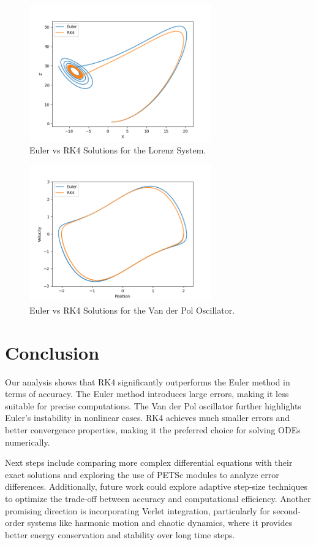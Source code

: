 \documentclass{article}
\begin{document}
\begin{center}
    \begin{figure}[htbp]
        \centering
        \includegraphics[width=0.7\textwidth]{results/figures/lorenz.png}
        \caption{Euler vs RK4 Solutions for the Lorenz System.}
        \label{fig:lorenz}
    \end{figure}
    
    \begin{figure}[htbp]
        \centering
        \includegraphics[width=0.7\textwidth]{results/figures/vdp.png}
        \caption{Euler vs RK4 Solutions for the Van der Pol Oscillator.}
        \label{fig:vanderpol}
    \end{figure}
    \end{center}
    
    \clearpage  %
    
\section{Conclusion}
Our analysis shows that RK4 significantly outperforms the Euler method in terms of accuracy. The Euler method introduces large errors, making it less suitable for precise computations. The Van der Pol oscillator further highlights Euler’s instability in nonlinear cases. RK4 achieves much smaller errors and better convergence properties, making it the preferred choice for solving ODEs numerically.

Next steps include comparing more complex differential equations with their exact solutions and exploring the use of PETSc modules to analyze error differences. Additionally, future work could explore adaptive step-size techniques to optimize the trade-off between accuracy and computational efficiency. Another promising direction is incorporating Verlet integration, particularly for second-order systems like harmonic motion and chaotic dynamics, where it provides better energy conservation and stability over long time steps.
\end{document}
